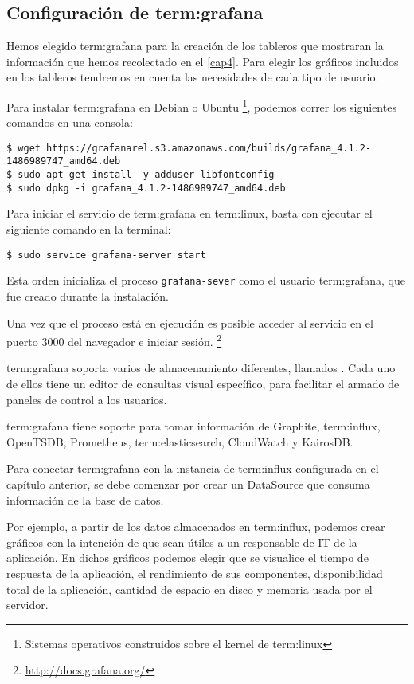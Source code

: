 \subsection{Configuración de \gls{term:grafana}}
\label{configuracion-de-grafana}

Hemos elegido \gls{term:grafana} para la creación de los tableros que mostraran
la información que hemos recolectado en el \autoref{cap4}. Para elegir los
gráficos incluidos en los tableros tendremos en cuenta las necesidades de cada
tipo de usuario.

Para instalar \gls{term:grafana} en Debian o Ubuntu
\footnote{Sistemas operativos construidos sobre el kernel de \gls{term:linux}},
podemos correr los siguientes comandos en una consola:

\begin{lstlisting}
$ wget https://grafanarel.s3.amazonaws.com/builds/grafana_4.1.2-1486989747_amd64.deb
$ sudo apt-get install -y adduser libfontconfig
$ sudo dpkg -i grafana_4.1.2-1486989747_amd64.deb
\end{lstlisting}

Para iniciar el servicio de \gls{term:grafana} en \gls{term:linux}, basta con
ejecutar el siguiente comando en la terminal:

\begin{lstlisting}
$ sudo service grafana-server start
\end{lstlisting}


Esta orden inicializa el proceso \texttt{grafana-sever} como el usuario
\gls{term:grafana}, que fue creado durante la instalación.

Una vez que el proceso está en ejecución es posible acceder al servicio en el
puerto 3000 del navegador e iniciar sesión.
\footnote{\url{http://docs.grafana.org/}}

\gls{term:grafana} soporta varios  de almacenamiento diferentes,
llamados . Cada uno de ellos tiene un editor de consultas
visual específico, para facilitar el armado de paneles de control a los
usuarios.

\gls{term:grafana} tiene soporte para tomar información de Graphite, \gls{term:influx},
OpenTSDB, Prometheus, \gls{term:elasticsearch}, CloudWatch y KairosDB.

Para conectar \gls{term:grafana} con la instancia de \gls{term:influx}
configurada en el capítulo anterior, se debe comenzar por crear un DataSource
que consuma información de la base de datos.

Por ejemplo, a partir de los datos almacenados en \gls{term:influx}, podemos
crear gráficos con la intención de que sean útiles a un responsable de IT de la
aplicación. En dichos gráficos podemos elegir que se visualice el tiempo de
respuesta de la aplicación, el rendimiento de sus componentes, disponibilidad
total de la aplicación, cantidad de espacio en disco y memoria usada por el
servidor.

